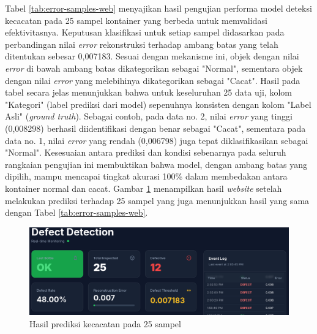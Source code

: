 Tabel \ref{tab:error-samples-web} menyajikan hasil pengujian
performa model deteksi kecacatan pada 25 sampel kontainer yang
berbeda untuk memvalidasi efektivitasnya. Keputusan klasifikasi untuk
setiap sampel didasarkan pada perbandingan nilai \textit{error} rekonstruksi
terhadap ambang batas yang telah ditentukan sebesar
0,007183. Sesuai dengan mekanisme ini, objek dengan nilai \textit{error} di
bawah ambang batas dikategorikan sebagai "Normal", sementara objek
dengan nilai \textit{error} yang melebihinya dikategorikan sebagai "Cacat".
Hasil pada tabel secara jelas menunjukkan bahwa untuk keseluruhan 25
data uji, kolom "Kategori" (label prediksi dari model) sepenuhnya
konsisten dengan kolom "Label Asli" (\textit{ground truth}). Sebagai
contoh, pada data no. 2, nilai \textit{error} yang tinggi (0,008298)
berhasil diidentifikasi dengan benar sebagai "Cacat", sementara pada
data no. 1, nilai \textit{error} yang rendah (0,006798) juga tepat
diklasifikasikan sebagai "Normal". Kesesuaian antara
prediksi dan kondisi sebenarnya pada seluruh rangkaian pengujian ini
membuktikan bahwa model, dengan ambang batas yang dipilih, mampu
mencapai tingkat akurasi 100\% dalam membedakan antara kontainer
normal dan cacat. Gambar \ref{fig:web-25} menampilkan hasil \textit{website}
setelah melakukan prediksi terhadap 25 sampel yang juga menunjukkan
hasil yang sama dengan Tabel \ref{tab:error-samples-web}.

\begin{figure}[H]
  \centering
  \includegraphics[width=\textwidth]{gambar/ss_web_25.png}
  \caption{Hasil prediksi kecacatan pada 25 sampel}
  \label{fig:web-25}
\end{figure}
\vspace{-1em}
